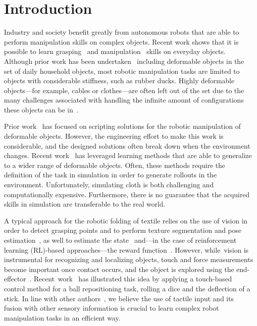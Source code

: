\documentclass[applsci,article,accept,moreauthors,pdftex]{Definitions/mdpi}
\begin{document}
\section{Introduction}
Industry and society benefit greatly from autonomous robots that are able to perform manipulation skills on complex objects. Recent work shows that it is possible to learn grasping~\cite{Levine2018, morrison2018cartman} and manipulation~\cite{Agrawal2016, Gu2017} skills on everyday objects. Although prior work has been undertaken~\cite{Levine2018} including deformable objects in the set of daily household objects, most robotic manipulation tasks are limited to objects with considerable stiffness, such as rubber ducks. Highly deformable objects---for example, cables or clothes---are often left out of the set due to the many challenges associated with handling the infinite amount of configurations these objects can be in~\cite{Foresti2004}.

Prior work~\cite{Saha2007, Maitin2010, Doumanoglou2016} has focused on scripting solutions for the robotic manipulation of deformable objects. However, the engineering effort to make this work is considerable, and the designed solutions often break down when the environment changes. Recent work~\cite{Matas2018, Seita2018} has leveraged learning methods that are able to generalize to a wider range of deformable objects. Often, these methods require the definition of the task in simulation in order to generate rollouts in the environment. Unfortunately, simulating cloth is both challenging and computationally expensive. Furthermore, there is no guarantee that the acquired skills in simulation are transferable to the real world. \par

A typical approach for the robotic folding of textile relies on the use of vision in order to detect grasping points and to perform texture segmentation and pose estimation~\cite{Maitin2010, Doumanoglou2016, Bersch2011}, as well to estimate the state~\cite{Matas2018} and---in the case of reinforcement learning (RL)-based approaches---the reward function~\cite{Tsurumine2019}. However, while~vision is instrumental for recognizing and localizing objects, touch and force measurements become important once contact occurs, and the object is explored using the end-effector~\cite{Billard2019}. Recent~work~\cite{Tian2019} has illustrated this idea by applying a touch-based control method for a ball repositioning task, rolling a dice and the deflection of a stick. In line with other authors~\cite{Tian2019, Lee2019}, we believe the use of tactile input and its fusion with other sensory information is crucial to learn complex robot manipulation tasks in an efficient way. \par
\end{document}
